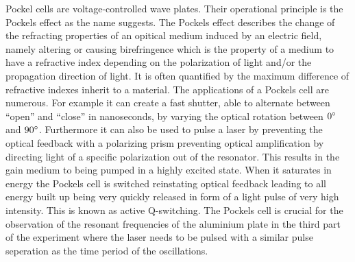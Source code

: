 Pockel cells are voltage-controlled wave plates. Their operational principle is the Pockels effect as the name suggests. The Pockels effect describes the change of the refracting properties of an opitical medium induced by an electric field, namely altering or causing birefringence which is the property of a medium to have a refractive index depending on the polarization of light and/or the propagation direction of light. It is often quantified by the maximum difference of refractive indexes inherit to a material. The applications of a Pockels cell are numerous. For example it can create a fast shutter, able to alternate between ``open'' and ``close'' in nanoseconds, by varying the optical rotation between $0^\circ$ and $90^\circ$. Furthermore it can also be used to pulse a laser by preventing the optical feedback with a polarizing prism preventing optical amplification by directing light of a specific polarization out of the resonator. This results in the gain medium to being pumped in a highly excited state. When it saturates in energy the Pockels cell is switched reinstating optical feedback leading to all energy built up being very quickly released in form of a light pulse of very high intensity. This is known as active Q-switching.
The Pockels cell is crucial for the observation of the resonant frequencies of the aluminium plate in the third part of the experiment where the laser needs to be pulsed with a similar pulse seperation as the time period of the oscillations.




